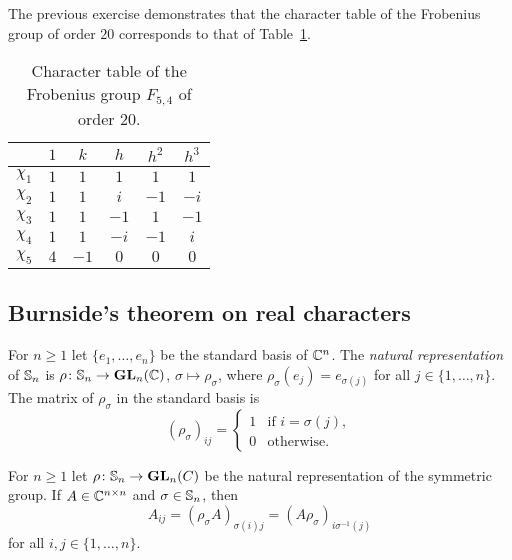 The previous exercise demonstrates that the character table of the 
Frobenius group of order $20$ corresponds to that of Table~\ref{tab:F5,4}.

\begin{table}[ht]
\caption{Character table of the Frobenius group $F_{5,4}$ of order $20$.}
\label{tab:F5,4}
        \begin{tabular}{|c|ccccc|}
             \hline
             & $1$ & $k$ & $h$ & $h^2$ & $h^3$\\
             \hline
             $\chi_1$ & $1$ & $1$ & $1$ & $1$ & $1$\\
             $\chi_2$ & $1$ & $1$ & $i$ & $-1$ & $-i$\\
             $\chi_3$ & $1$ & $1$ & $-1$ & $1$ & $-1$\\
             $\chi_4$ & $1$ & $1$ & $-i$ & $-1$ & $i$\\
             $\chi_5$ & $4$ & $-1$ & $0$ & $0$ & $0$\\
             \hline
        \end{tabular}
    \end{table} 

\subsection{Burnside's theorem on real characters}

For $n\geq1$ let $\{e_1,\dots,e_n\}$ be the standard basis of $\mathbb{C}^n$.  
The \emph{natural representation} of $\mathbb{S}_n$ is 
$\rho\colon\mathbb{S}_n\to\mathbf{GL}_n(\mathbb{C})$, $\sigma\mapsto\rho_{\sigma}$, 
where $\rho_\sigma(e_j)=e_{\sigma(j)}$ for all $j\in\{1,\dots,n\}$. 
The matrix of $\rho_\sigma$ in the standard basis is  
\begin{equation}
    \label{eq:Sn_natural}
    (\rho_\sigma)_{ij}=\begin{cases}
      1 & \text{if $i=\sigma(j)$},\\
      0 & \text{otherwise}.
    \end{cases}
\end{equation}

\begin{lemma}
	\label{lem:permutaciones}
	For $n\geq1$ let $\rho\colon\mathbb{S}_n\to\mathbf{GL}_n(C)$ be the natural 
	representation of the symmetric group. 
	If $A\in\mathbb{C}^{n\times n}$ and $\sigma\in\mathbb{S}_n$, then
	\[
		A_{ij}=(\rho_{\sigma}A)_{\sigma(i)j}=(A\rho_{\sigma})_{i\sigma^{-1}(j)}
	\]
    for all $i,j\in\{1,\dots,n\}$.
\end{lemma}

